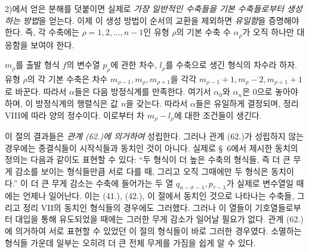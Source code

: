 
2)에서 얻은 분해를 덧붙이면 실제로 \emph{가장 일반적인 수축들을 기본 수축들로부터 생성하는 방법}을 얻는다. 이제 이 생성 방법이 순서의 교환을 제외하면 \emph{유일함}을 증명해야 한다. 즉, 각 수축에는 $\rho=1,2,\ldots,n-1$인 유형 $\rho$의 기본 수축 수 $\alpha_\rho$가 오직 하나만 대응함을 보여야 한다.

$m_\rho$를 출발 형식 $f$의 변수열 $p_\rho$에 관한 차수, $l_\rho$를 수축으로 생긴 형식의 차수라 하자. 유형 $\rho$의 각 기본 수축은 차수 $m_{\rho-1},m_\rho,m_{\rho+1}$을 각각 $m_{\rho-1}+1,m_\rho-2,m_{\rho+1}+1$로 바꾼다. 따라서 $\alpha$들은 다음 방정식계를 만족한다.
여기서 $\alpha_0$와 $\alpha_n$은 0으로 놓아야 하며, 이 방정식계의 행렬식은 값 $n$을 갖는다. 따라서 $\alpha$들은 유일하게 결정되며, 정리 VIII에 따라 양의 정수이다. 이로부터 차 $m_\rho-l_\rho$에 대한 조건들이 생긴다.

이 절의 결과들은 \emph{관계 (62.)에 의거하여} 성립한다. 그러나 관계 (62.)가 성립하지 않는 경우에는 종결식들이 시작식들과 동치인 것이 아니다. 실제로 \S\ 6에서 제시한 동치의 정의는 다음과 같이도 표현할 수 있다: “두 형식이 더 높은 수축의 형식들, 즉 더 큰 무게 감소를 보이는 형식들만큼 서로 다를 때, 그리고 오직 그때에만 두 형식은 동치이다.” 이 더 큰 무게 감소는 수축에 들어가는 두 열 $q_{n-\sigma-\lambda},p_{\tau-\lambda}$가 실제로 변수열일 때에는 언제나 일어난다. 이는 (41.), (42.), 이 절에서 동치인 것으로 나타나는 수축들, 그리고 정리 VII의 동치인 형식들의 경우에도 그러했다. 그러나 이 열들이 기호열들로부터 대입을 통해 유도되었을 때에는 그러한 무게 감소가 일어날 필요가 없다. 관계 (62.)에 의거하여 서로 표현할 수 있었던 이 절의 형식들이 바로 그러한 경우였다. 소멸하는 형식들 가운데 일부는 오히려 더 큰 전체 무게를 가짐을 쉽게 알 수 있다.
